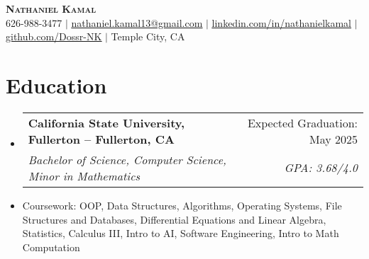 \documentclass[letterpaper,11pt]{article}
\makeatletter
\newcommand{\resumeItem}[1]{
  \item\small{
    {#1 \vspace{-2pt}}
  }
}
\newcommand{\resumeSubheading}[4]{
  \vspace{-2pt}\item
    \begin{tabular*}{0.97\textwidth}[t]{l@{\extracolsep{\fill}}r}
      \textbf{#1} & #2 \\
      \textit{\small#3} & \textit{\small #4} \\
    \end{tabular*}\vspace{-7pt}
}
\newcommand{\resumeSubHeadingListStart}{\begin{itemize}[leftmargin=0.15in, label={}]}
\newcommand{\resumeSubHeadingListEnd}{\end{itemize}}
\makeatother
\begin{document}

\begin{center}
    \textbf{\Huge \scshape Nathaniel Kamal} \\ \vspace{1pt}
    \small 626-988-3477 $|$ \href{mailto:nathaniel.kamal13@gmail.com}{\underline{nathaniel.kamal13@gmail.com}} $|$ 
    \href{https://linkedin.com/in/nathanielkamal}{\underline{linkedin.com/in/nathanielkamal}} $|$
    \href{https://github.com/Dossr-NK}{\underline{github.com/Dossr-NK}} $|$
    \small Temple City, CA
\end{center}


\section{Education}
  \resumeSubHeadingListStart
    \resumeSubheading
      {California State University, Fullerton -- Fullerton, CA}{Expected Graduation: May 2025}
      {Bachelor of Science, Computer Science, Minor in Mathematics}{GPA: 3.68/4.0}
    \resumeItem{Coursework: OOP, Data Structures, Algorithms, Operating Systems, File Structures and Databases, Differential Equations and Linear Algebra, Statistics, Calculus III, Intro to AI, Software Engineering, Intro to Math Computation}
  \resumeSubHeadingListEnd


\end{document}
